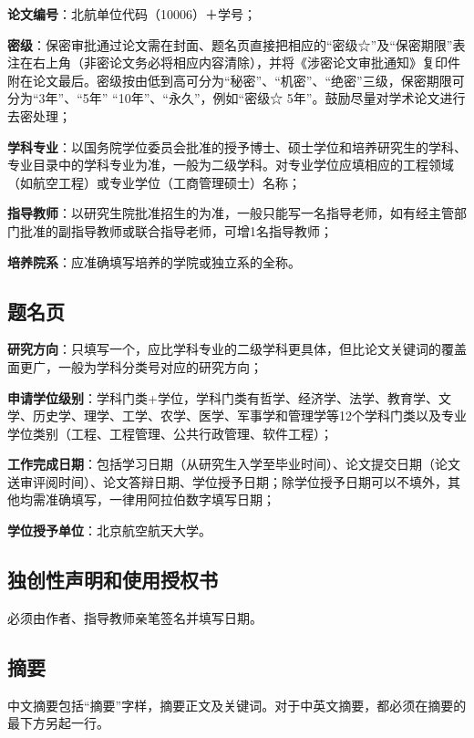 {\bfseries 论文编号}：北航单位代码（10006）＋学号；

{\bfseries 密级}：保密审批通过论文需在封面、题名页直接把相应的“密级☆”及“保密期限”表注在右上角（非密论文务必将相应内容清除），并将《涉密论文审批通知》复印件附在论文最后。密级按由低到高可分为“秘密”、“机密”、“绝密”三级，保密期限可分为“3年”、“5年” “10年”、“永久”，例如“密级☆ 5年”。鼓励尽量对学术论文进行去密处理；

{\bfseries 学科专业}：以国务院学位委员会批准的授予博士、硕士学位和培养研究生的学科、专业目录中的学科专业为准，一般为二级学科。对专业学位应填相应的工程领域（如航空工程）或专业学位（工商管理硕士）名称；

{\bfseries 指导教师}：以研究生院批准招生的为准，一般只能写一名指导老师，如有经主管部门批准的副指导教师或联合指导老师，可增1名指导教师；

{\bfseries 培养院系}：应准确填写培养的学院或独立系的全称。

\subsection{题名页}

{\bfseries 研究方向}：只填写一个，应比学科专业的二级学科更具体，但比论文关键词的覆盖面更广，一般为学科分类号对应的研究方向；

{\bfseries 申请学位级别}：学科门类+学位，学科门类有哲学、经济学、法学、教育学、文学、历史学、理学、工学、农学、医学、军事学和管理学等12个学科门类以及专业学位类别（工程、工程管理、公共行政管理、软件工程）；

{\bfseries 工作完成日期}：包括学习日期（从研究生入学至毕业时间）、论文提交日期（论文送审评阅时间）、论文答辩日期、学位授予日期；除学位授予日期可以不填外，其他均需准确填写，一律用阿拉伯数字填写日期；

{\bfseries 学位授予单位}：北京航空航天大学。

\subsection{独创性声明和使用授权书}

必须由作者、指导教师亲笔签名并填写日期。

\subsection{摘要}

中文摘要包括“摘要”字样，摘要正文及关键词。对于中英文摘要，都必须在摘要的最下方另起一行。

